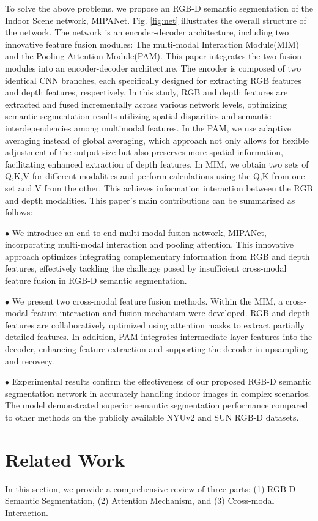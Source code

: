 \documentclass{aims}
\numberwithin{equation}{section}
\begin{document}
To solve the above problems, we propose an RGB-D semantic segmentation of the Indoor Scene network, MIPANet. Fig. \ref{fig:net} illustrates the overall structure of the network. The network is an encoder-decoder architecture, including two innovative feature fusion modules: The multi-modal Interaction Module(MIM) and the Pooling Attention Module(PAM). This paper integrates the two fusion modules into an encoder-decoder architecture. The encoder is composed of two identical CNN branches, each specifically designed for extracting RGB features and depth features, respectively. In this study, RGB and depth features are extracted and fused incrementally across various network levels, optimizing semantic segmentation results utilizing spatial disparities and semantic interdependencies among multimodal features. In the PAM, we use adaptive averaging instead of global averaging, which approach not only allows for flexible adjustment of the output size but also preserves more spatial information, facilitating enhanced extraction of depth features. In MIM, we obtain two sets of Q,K,V for different modalities and perform calculations using the Q,K from one set and V from the other. This achieves information interaction between the RGB and depth modalities. This paper's main contributions can be summarized as follows:

$\bullet$ We introduce an end-to-end multi-modal fusion network, MIPANet, incorporating multi-modal interaction and pooling attention. This innovative approach optimizes integrating complementary information from RGB and depth features, effectively tackling the challenge posed by insufficient cross-modal feature fusion in RGB-D semantic segmentation.

$\bullet$ We present two cross-modal feature fusion methods. Within the MIM, a cross-modal feature interaction and fusion mechanism were developed. RGB and depth features are collaboratively optimized using attention masks to extract partially detailed features. In addition, PAM integrates intermediate layer features into the decoder, enhancing feature extraction and supporting the decoder in upsampling and recovery.

$\bullet$ Experimental results confirm the effectiveness of our proposed RGB-D semantic segmentation network in accurately handling indoor images in complex scenarios. The model demonstrated superior semantic segmentation performance compared to other methods on the publicly available NYUv2 and SUN RGB-D datasets.

\section{Related Work}
In this section, we provide a comprehensive review of three parts: (1) RGB-D Semantic Segmentation, (2) Attention Mechanism, and (3) Cross-modal Interaction.
\end{document}
